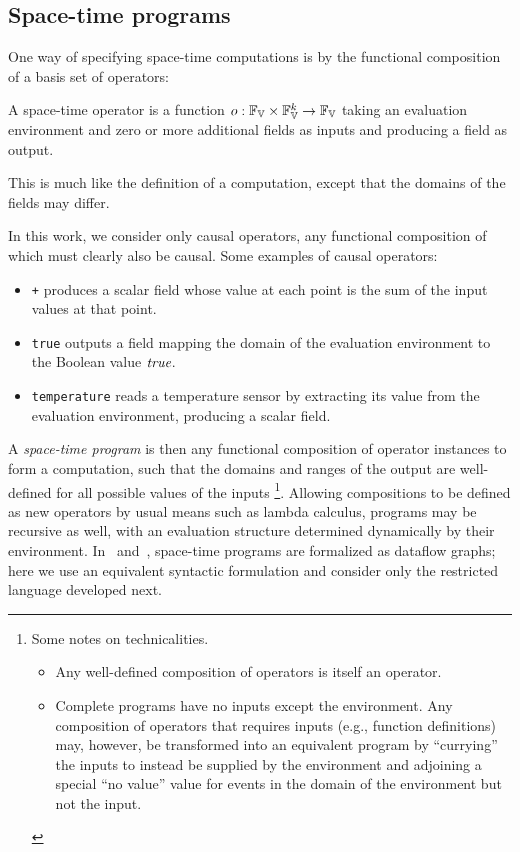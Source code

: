 \documentclass[12pt,a4paper,twoside,openright]{book}
\begin{document}
\subsection{Space-time programs}

One way of specifying space-time computations is by the functional composition of a basis set of operators:
%
\begin{thrdefn}\label{def:operator}
A space-time operator is a function 
$o: \fieldsof{\spaceof{\datavalue}} \times \fieldsof{\spaceof{\datavalue}}^k \rightarrow \fieldsof{\spaceof{\datavalue}}$
taking an evaluation environment and zero or more additional fields
as inputs and producing a field as output.
\end{thrdefn}
\noindent
This is much like the definition of a computation, except that the domains of the fields may differ.

In this work, we consider only causal operators, any functional composition of which must clearly also be causal.
%
Some examples of causal operators:
\begin{itemize}
\item {\tt +} produces a scalar field whose value at each point is the sum of the input values at that point.
\item {\tt true} outputs a field mapping the domain of the evaluation environment to the Boolean value $\textit{true}$.
\item {\tt temperature} reads a temperature sensor by extracting its value from the evaluation environment, producing a scalar field.
\end{itemize}

A {\em space-time program} is then any functional composition of operator instances to form a computation, such that the domains and ranges of the output are well-defined for all possible values of the inputs
\footnote{Some notes on technicalities.
	\begin{itemize}
		\item Any well-defined composition of operators is itself an operator.
		\item Complete programs have no inputs except the environment.  Any composition of operators that requires inputs (e.g., function definitions) may, however, be transformed into an equivalent program by ``currying'' the inputs to instead be supplied by the environment and adjoining a special ``no value'' value for events in the domain of the environment but not the input.
	\end{itemize}
}.
%
Allowing compositions to be defined as new operators by usual means such as lambda calculus, programs may be recursive as well, with an evaluation structure determined dynamically by their environment.
%
In~\cite{BealUsbeck12} and~\cite{BVD-SCW14}, space-time programs are formalized as dataflow graphs; here we use an equivalent syntactic formulation and consider only the restricted language developed next.
\end{document}
